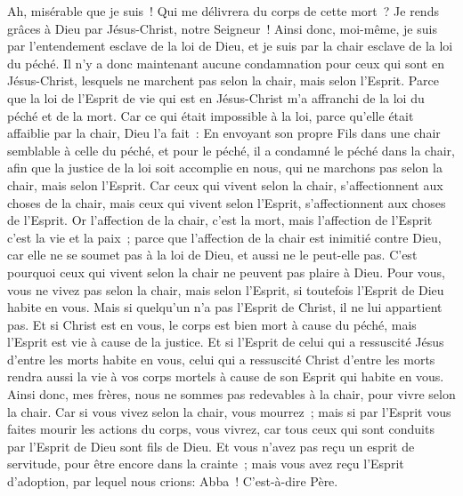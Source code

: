 \begin{multicols}{2}
Ah, misérable que je suis~! Qui me délivrera du corps de cette mort~?
Je rends grâces à Dieu par Jésus-Christ, notre Seigneur~! Ainsi donc, moi-même, je suis par l'entendement esclave de la loi de Dieu, et je suis par la chair esclave de la loi du péché.
\VerseOne{}Il n'y a donc maintenant aucune condamnation pour ceux qui sont en Jésus-Christ, lesquels ne marchent pas selon la chair, mais selon l'Esprit.
Parce que la loi de l'Esprit de vie qui est en Jésus-Christ m'a affranchi de la loi du péché et de la mort.
Car ce qui était impossible à la loi, parce qu'elle était affaiblie par la chair, Dieu l'a fait~: En envoyant son propre Fils dans une chair semblable à celle du péché, et pour le péché, il a condamné le péché dans la chair,
afin que la justice de la loi soit accomplie en nous, qui ne marchons pas selon la chair, mais selon l'Esprit.
Car ceux qui vivent selon la chair, s'affectionnent aux choses de la chair, mais ceux qui vivent selon l'Esprit, s'affectionnent aux choses de l'Esprit.
Or l'affection de la chair, c'est la mort, mais l'affection de l'Esprit c'est la vie et la paix~;
parce que l'affection de la chair est inimitié contre Dieu, car elle ne se soumet pas à la loi de Dieu, et aussi ne le peut-elle pas.
C'est pourquoi ceux qui vivent selon la chair ne peuvent pas plaire à Dieu.
Pour vous, vous ne vivez pas selon la chair, mais selon l'Esprit, si toutefois l'Esprit de Dieu habite en vous. Mais si quelqu'un n'a pas l'Esprit de Christ, il ne lui appartient pas.
Et si Christ est en vous, le corps est bien mort à cause du péché, mais l'Esprit est vie à cause de la justice.
Et si l'Esprit de celui qui a ressuscité Jésus d'entre les morts habite en vous, celui qui a ressuscité Christ d'entre les morts rendra aussi la vie à vos corps mortels à cause de son Esprit qui habite en vous.
Ainsi donc, mes frères, nous ne sommes pas redevables à la chair, pour vivre selon la chair.
Car si vous vivez selon la chair, vous mourrez~; mais si par l'Esprit vous faites mourir les actions du corps, vous vivrez,
car tous ceux qui sont conduits par l'Esprit de Dieu sont fils de Dieu.
Et vous n'avez pas reçu un esprit de servitude, pour être encore dans la crainte~; mais vous avez reçu l'Esprit d'adoption, par lequel nous crions: Abba~! C'est-à-dire Père.

\end{multicols}
